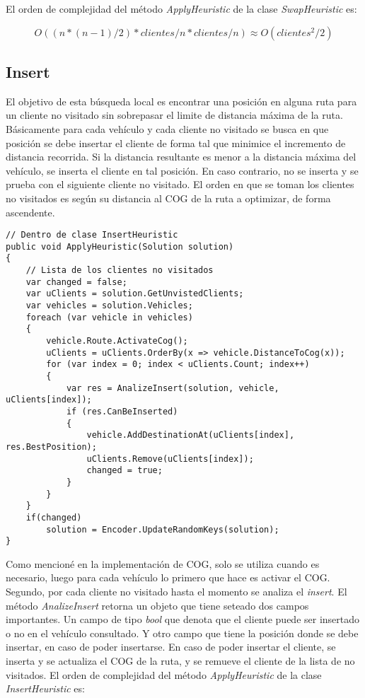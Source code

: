 \bigskip

El orden de complejidad del método \textit{ApplyHeuristic} de la clase \textit{SwapHeuristic} es:

\begin{equation*}
O((n * (n-1) / 2 ) * clientes/n * clientes/n) \approx O(clientes^2/2)
\end{equation*}

\subsection{Insert}

El objetivo de esta búsqueda local es encontrar una posición en alguna ruta para un cliente no visitado sin sobrepasar el limite de distancia máxima de la ruta. Básicamente para cada vehículo y cada cliente no visitado se busca en que posición se debe insertar el cliente de forma tal que minimice el incremento de distancia recorrida. Si la distancia resultante es menor a la distancia máxima del vehículo, se inserta el cliente en tal posición. En caso contrario, no se inserta y se prueba con el siguiente cliente no visitado. El orden en que se toman los clientes no visitados es según su distancia al COG de la ruta a optimizar, de forma ascendente.

\begin{minipage}{\textwidth}
\begin{lstlisting}
// Dentro de clase InsertHeuristic
public void ApplyHeuristic(Solution solution)
{
	// Lista de los clientes no visitados
	var changed = false;	
	var uClients = solution.GetUnvistedClients;	
	var vehicles = solution.Vehicles;
	foreach (var vehicle in vehicles)
	{
		vehicle.Route.ActivateCog();
		uClients = uClients.OrderBy(x => vehicle.DistanceToCog(x));	
		for (var index = 0; index < uClients.Count; index++)
		{
			var res = AnalizeInsert(solution, vehicle, uClients[index]);
			if (res.CanBeInserted)
			{
				vehicle.AddDestinationAt(uClients[index], res.BestPosition);
				uClients.Remove(uClients[index]);
				changed = true;
			}
		}
	}
	if(changed)
		solution = Encoder.UpdateRandomKeys(solution);
}
\end{lstlisting}
\end{minipage}

\bigskip

Como mencioné en la implementación de COG, solo se utiliza cuando es necesario, luego para cada vehículo lo primero que hace es activar el COG. Segundo, por cada cliente no visitado hasta el momento se analiza el \textit{insert}. El método \textit{AnalizeInsert} retorna un objeto que tiene seteado dos campos importantes. Un campo de tipo \textit{bool} que denota que el cliente puede ser insertado o no en el vehículo consultado. Y otro campo que tiene la posición donde se debe insertar, en caso de poder insertarse. En caso de poder insertar el cliente, se inserta y se actualiza el COG de la ruta, y se remueve el cliente de la lista de no visitados. El orden de complejidad del método \textit{ApplyHeuristic} de la clase \textit{InsertHeuristic} es: 

